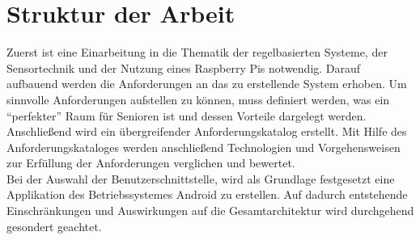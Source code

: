 \section{Struktur der Arbeit}
Zuerst ist eine Einarbeitung in die Thematik der regelbasierten Systeme, der Sensortechnik und der Nutzung eines Raspberry Pis notwendig. Darauf aufbauend werden die Anforderungen an das zu erstellende System erhoben. Um sinnvolle Anforderungen aufstellen zu können, muss definiert werden, was ein ``perfekter'' Raum für Senioren ist und dessen Vorteile dargelegt werden. Anschließend wird ein übergreifender Anforderungskatalog erstellt. Mit Hilfe des Anforderungskataloges werden anschließend Technologien und Vorgehensweisen zur Erfüllung der Anforderungen verglichen und bewertet.\\
Bei der Auswahl der Benutzerschnittstelle, wird als Grundlage festgesetzt eine Applikation des Betriebssystemes Android zu erstellen. Auf dadurch entstehende Einschränkungen und Auswirkungen auf die Gesamtarchitektur wird durchgehend gesondert geachtet. 	